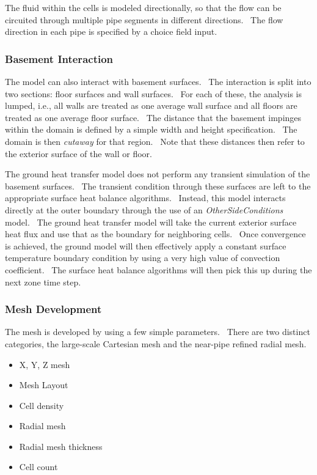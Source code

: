 The fluid within the cells is modeled directionally, so that the flow can be circuited through multiple pipe segments in different directions.~ The flow direction in each pipe is specified by a choice field input.

\subsubsection{Basement Interaction}\label{basement-interaction}

The model can also interact with basement surfaces.~ The interaction is split into two sections: floor surfaces and wall surfaces.~ For each of these, the analysis is lumped, i.e., all walls are treated as one average wall surface and all floors are treated as one average floor surface.~ The distance that the basement impinges within the domain is defined by a simple width and height specification.~ The domain is then \emph{cutaway} for that region.~ Note that these distances then refer to the exterior surface of the wall or floor.

The ground heat transfer model does not perform any transient simulation of the basement surfaces.~ The transient condition through these surfaces are left to the appropriate surface heat balance algorithms.~ Instead, this model interacts directly at the outer boundary through the use of an \emph{OtherSideConditions} model.~ The ground heat transfer model will take the current exterior surface heat flux and use that as the boundary for neighboring cells.~ Once convergence is achieved, the ground model will then effectively apply a constant surface temperature boundary condition by using a very high value of convection coefficient.~ The surface heat balance algorithms will then pick this up during the next zone time step.

\subsubsection{Mesh Development}\label{mesh-development}

The mesh is developed by using a few simple parameters.~ There are two distinct categories, the large-scale Cartesian mesh and the near-pipe refined radial mesh.

\begin{itemize}
\item
  X, Y, Z mesh
\item
  Mesh Layout
\item
  Cell density
\item
  Radial mesh
\item
  Radial mesh thickness
\item
  Cell count
\end{itemize}

